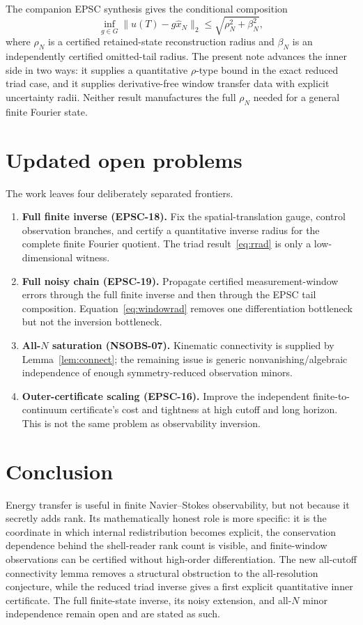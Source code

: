 \documentclass[11pt]{article}
\theoremstyle{definition}
\begin{document}
The companion EPSC synthesis gives the conditional composition
\[
\inf_{g\in G}\|u(T)-g\widehat x_N\|_2
\le\sqrt{\rho_N^2+\beta_N^2},
\]
where $\rho_N$ is a certified retained-state reconstruction radius and $\beta_N$ is an independently
certified omitted-tail radius.  The present note advances the inner side in two ways: it supplies a
quantitative $\rho$-type bound in the exact reduced triad case, and it supplies derivative-free
window transfer data with explicit uncertainty radii.  Neither result manufactures the full
$\rho_N$ needed for a general finite Fourier state.

\section{Updated open problems}

The work leaves four deliberately separated frontiers.

\begin{enumerate}
\item \textbf{Full finite inverse (EPSC-18).}  Fix the spatial-translation gauge, control observation
branches, and certify a quantitative inverse radius for the complete finite Fourier quotient.  The
triad result~\eqref{eq:rrad} is only a low-dimensional witness.
\item \textbf{Full noisy chain (EPSC-19).}  Propagate certified measurement-window errors through the
full finite inverse and then through the EPSC tail composition.  Equation~\eqref{eq:windowrad}
removes one differentiation bottleneck but not the inversion bottleneck.
\item \textbf{All-$N$ saturation (NSOBS-07).}  Kinematic connectivity is supplied by
Lemma~\ref{lem:connect}; the remaining issue is generic nonvanishing/algebraic independence of enough
symmetry-reduced observation minors.
\item \textbf{Outer-certificate scaling (EPSC-16).}  Improve the independent finite-to-continuum
certificate's cost and tightness at high cutoff and long horizon.  This is not the same problem as
observability inversion.
\end{enumerate}

\section{Conclusion}

Energy transfer is useful in finite Navier--Stokes observability, but not because it secretly adds
rank.  Its mathematically honest role is more specific: it is the coordinate in which internal
redistribution becomes explicit, the conservation dependence behind the shell-reader rank count is
visible, and finite-window observations can be certified without high-order differentiation.  The
new all-cutoff connectivity lemma removes a structural obstruction to the all-resolution
conjecture, while the reduced triad inverse gives a first explicit quantitative inner certificate.
The full finite-state inverse, its noisy extension, and all-$N$ minor independence remain open and
are stated as such.
\end{document}
